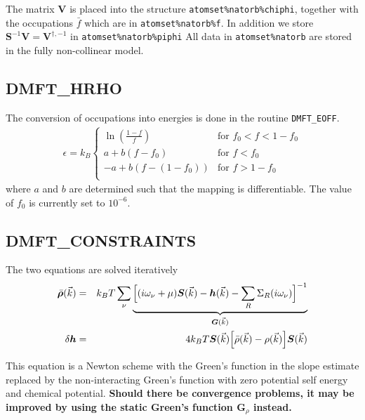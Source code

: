 \documentclass[11pt,a4paper]{report}
\newcommand{\mat}[1]{\bm{#1}}  %
\begin{document}
The matrix $\mat{V}$ is placed into the structure
\verb|atomset%natorb%chiphi|, together with the occupations $\bar{f}$
which are in \verb|atomset%natorb%f|. In addition we store
$\mat{S}^{-1}\mat{V}=\mat{V}^{\dagger,-1}$ in
\verb|atomset%natorb%piphi| All data in \verb|atomset%natorb| are
stored in the fully non-collinear model.

\subsection{DMFT\_HRHO}
The conversion of occupations into energies is done in the routine
\verb|DMFT_EOFF|.
\begin{eqnarray}
\epsilon=k_B
\begin{cases}
\ln\left(\frac{1-f}{f}\right) &\text{for $f_0<f<1-f_0$}\\
a+b(f-f_0)&\text{for $f<f_0$}\\
-a+b(f-(1-f_0))&\text{for $f>1-f_0$}\\
\end{cases}
\end{eqnarray}
where $a$ and $b$ are determined such that the mapping is
differentiable. The value of $f_0$ is currently set to $10^{-6}$.

\subsection{DMFT\_CONSTRAINTS}
The two equations are solved iteratively
\begin{eqnarray}
\bar{\mat{\rho}}(\vec{k})&=&k_BT\sum_\nu
\underbrace{\Bigl[
(i\omega_\nu+\mu)\mat{S}(\vec{k})-\mat{h}(\vec{k})-\sum_R \Sigma_R(i\omega_\nu)
\Bigr]^{-1}}_{\mat{G}(\vec{k})}
\\
\delta\mat{h}&=&4k_BT\mat{S}(\vec{k})\Bigl[
\bar{\rho}(\vec{k})-\rho(\vec{k})\Bigr]
\mat{S}(\vec{k})
\end{eqnarray}

This equation is a Newton scheme with the Green's function in the
slope estimate replaced by the non-interacting Green's function with
zero potential self energy and chemical potential. \textbf{Should
  there be convergence problems, it may be improved by using the
  static Green's function $\mat{G}_\rho$ instead.}
\end{document}
